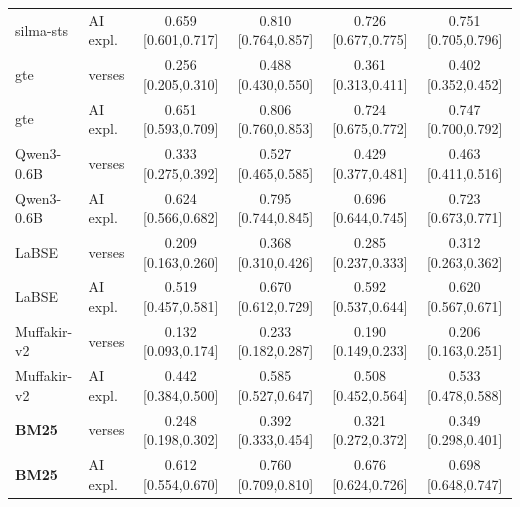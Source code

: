 \begin{tabular}{ll cccc}
silma-sts & AI expl. & 0.659 \scriptsize [0.601,0.717] & 0.810 \scriptsize [0.764,0.857] & 0.726 \scriptsize [0.677,0.775] & 0.751 \scriptsize [0.705,0.796] \\
gte & verses & 0.256 \scriptsize [0.205,0.310] & 0.488 \scriptsize [0.430,0.550] & 0.361 \scriptsize [0.313,0.411] & 0.402 \scriptsize [0.352,0.452] \\
gte & AI expl. & 0.651 \scriptsize [0.593,0.709] & 0.806 \scriptsize [0.760,0.853] & 0.724 \scriptsize [0.675,0.772] & 0.747 \scriptsize [0.700,0.792] \\
Qwen3-0.6B & verses & 0.333 \scriptsize [0.275,0.392] & 0.527 \scriptsize [0.465,0.585] & 0.429 \scriptsize [0.377,0.481] & 0.463 \scriptsize [0.411,0.516] \\
Qwen3-0.6B & AI expl. & 0.624 \scriptsize [0.566,0.682] & 0.795 \scriptsize [0.744,0.845] & 0.696 \scriptsize [0.644,0.745] & 0.723 \scriptsize [0.673,0.771] \\
LaBSE & verses & 0.209 \scriptsize [0.163,0.260] & 0.368 \scriptsize [0.310,0.426] & 0.285 \scriptsize [0.237,0.333] & 0.312 \scriptsize [0.263,0.362] \\
LaBSE & AI expl. & 0.519 \scriptsize [0.457,0.581] & 0.670 \scriptsize [0.612,0.729] & 0.592 \scriptsize [0.537,0.644] & 0.620 \scriptsize [0.567,0.671] \\
Muffakir-v2 & verses & 0.132 \scriptsize [0.093,0.174] & 0.233 \scriptsize [0.182,0.287] & 0.190 \scriptsize [0.149,0.233] & 0.206 \scriptsize [0.163,0.251] \\
Muffakir-v2 & AI expl. & 0.442 \scriptsize [0.384,0.500] & 0.585 \scriptsize [0.527,0.647] & 0.508 \scriptsize [0.452,0.564] & 0.533 \scriptsize [0.478,0.588] \\
\textbf{BM25} & verses & 0.248 \scriptsize [0.198,0.302] & 0.392 \scriptsize [0.333,0.454] & 0.321 \scriptsize [0.272,0.372] & 0.349 \scriptsize [0.298,0.401] \\
\textbf{BM25} & AI expl. & 0.612 \scriptsize [0.554,0.670] & 0.760 \scriptsize [0.709,0.810] & 0.676 \scriptsize [0.624,0.726] & 0.698 \scriptsize [0.648,0.747] \\
\bottomrule
\end{tabular}
